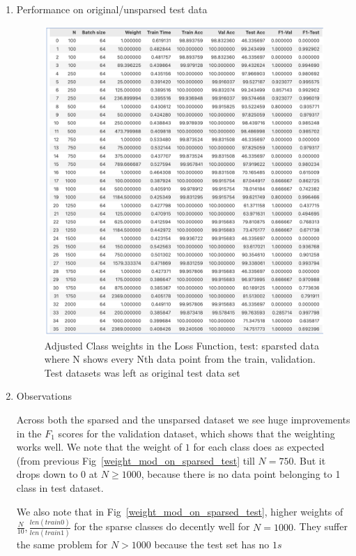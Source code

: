 \begin{solve}
\begin{enumerate}
    \item {Performance on original/unsparsed test data}
    \begin{figure}[H]
        \includegraphics[scale=.72]{plots/2_weight_og.png}
        \caption{Adjusted Class weights in the  Loss Function, test: sparsted data where N shows every Nth data point from the train, validation. Test datasets was left as original test data set}
        \label{weight_mod_on_unsparsed_test}
    \end{figure}

    \item {Observations}
    
    Across both the sparsed and the unsparsed dataset we see huge improvements in the $F_1$ scores for the validation dataset, which shows that the weighting works well. We note  that the weight of $1$ for each class does as expected (from previous Fig~\ref{weight_mod_on_sparsed_test} till $N=750$. But it drops down to 0 at $N\geq 1000$, because there is no data point belonging to 1 class in test dataset.

    We also note that in  Fig~\ref{weight_mod_on_sparsed_test}, higher weights of $ \frac{N}{10}, \frac{len(train 0)}{len(train 1)}$ for the sparse classes do decently well for $N=1000$. They suffer the same problem for $N>1000$ because the test set has no $1s$


\end{enumerate}
\end{solve}
